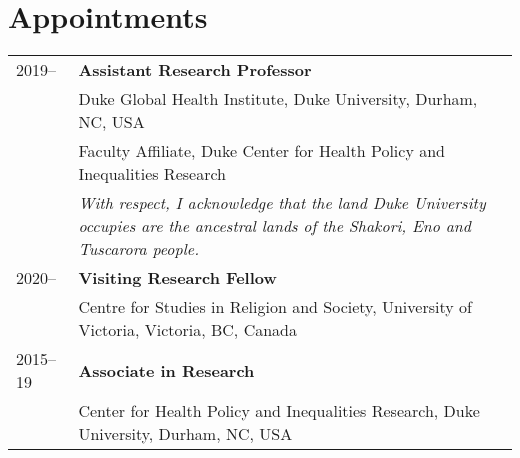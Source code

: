 \vspace{3ex}
\section*{Appointments}
\begin{longtable}{p{} p{}}
2019-- & \textbf{Assistant Research Professor}\\
		             & Duke Global Health Institute, Duke University, Durham, NC, USA \\
		             & Faculty Affiliate, Duke Center for Health Policy and Inequalities Research\\
		             & \emph{With respect, I  acknowledge that the land Duke University occupies are the ancestral lands of the Shakori, Eno and Tuscarora people.}\\
2020-- & \textbf{Visiting Research Fellow}\\
	& Centre for Studies in Religion and Society, University of Victoria, Victoria, BC, Canada \\
	2015--19 & \textbf{Associate in Research}\\
	& Center for Health Policy and Inequalities Research, Duke University, Durham, NC, USA \\
\end{longtable}